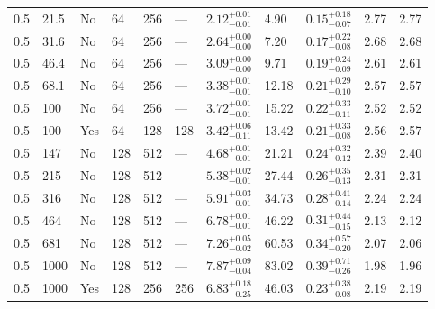 \documentclass[aps, prfluids, onecolumn, notitlepage, nofootinbib, groupedaddress, amsfonts, amssymb, amsmath]{revtex4-1}
\begin{document}
\begin{center}
\begin{longtable}{ p{1cm} p{1cm} p{1cm} p{1cm} p{1cm} p{1cm} p{1.75cm} p{1.5cm} p{2.75cm} p{1cm} p{1.2cm}  }
\vspace{0.08cm}0.5	&	21.5	&	No	&	64	&	256	&	---	&$	2.12	_{-	0.01	}^{+	0.01	}$&	4.90	&$	0.15	_{-	0.07	}^{+	0.18	}$&	2.77	&	2.77	\\
\vspace{0.08cm}0.5	&	31.6	&	No	&	64	&	256	&	---	&$	2.64	_{-	0.00	}^{+	0.00	}$&	7.20	&$	0.17	_{-	0.08	}^{+	0.22	}$&	2.68	&	2.68	\\
\vspace{0.08cm}0.5	&	46.4	&	No	&	64	&	256	&	---	&$	3.09	_{-	0.00	}^{+	0.00	}$&	9.71	&$	0.19	_{-	0.09	}^{+	0.24	}$&	2.61	&	2.61	\\
\vspace{0.08cm}0.5	&	68.1	&	No	&	64	&	256	&	---	&$	3.38	_{-	0.01	}^{+	0.01	}$&	12.18	&$	0.21	_{-	0.10	}^{+	0.29	}$&	2.57	&	2.57	\\
\vspace{0.08cm}0.5	&	100	&	No	&	64	&	256	&	---	&$	3.72	_{-	0.01	}^{+	0.01	}$&	15.22	&$	0.22	_{-	0.11	}^{+	0.33	}$&	2.52	&	2.52	\\
\vspace{0.08cm}0.5	&	100	&	Yes	&	64	&	128	&	128	&$	3.42	_{-	0.11	}^{+	0.06	}$&	13.42	&$	0.21	_{-	0.08	}^{+	0.33	}$&	2.56	&	2.57	\\
\vspace{0.08cm}0.5	&	147	&	No	&	128	&	512	&	---	&$	4.68	_{-	0.01	}^{+	0.01	}$&	21.21	&$	0.24	_{-	0.12	}^{+	0.32	}$&	2.39	&	2.40	\\
\vspace{0.08cm}0.5	&	215	&	No	&	128	&	512	&	---	&$	5.38	_{-	0.01	}^{+	0.02	}$&	27.44	&$	0.26	_{-	0.13	}^{+	0.35	}$&	2.31	&	2.31	\\
\vspace{0.08cm}0.5	&	316	&	No	&	128	&	512	&	---	&$	5.91	_{-	0.01	}^{+	0.03	}$&	34.73	&$	0.28	_{-	0.14	}^{+	0.41	}$&	2.24	&	2.24	\\
\vspace{0.08cm}0.5	&	464	&	No	&	128	&	512	&	---	&$	6.78	_{-	0.01	}^{+	0.01	}$&	46.22	&$	0.31	_{-	0.15	}^{+	0.44	}$&	2.13	&	2.12	\\
\vspace{0.08cm}0.5	&	681	&	No	&	128	&	512	&	---	&$	7.26	_{-	0.02	}^{+	0.05	}$&	60.53	&$	0.34	_{-	0.20	}^{+	0.57	}$&	2.07	&	2.06	\\
\vspace{0.08cm}0.5	&	1000	&	No	&	128	&	512	&	---	&$	7.87	_{-	0.04	}^{+	0.09	}$&	83.02	&$	0.39	_{-	0.26	}^{+	0.71	}$&	1.98	&	1.96	\\
\vspace{0.08cm}0.5	&	1000	&	Yes	&	128	&	256	&	256	&$	6.83	_{-	0.25	}^{+	0.18	}$&	46.03	&$	0.23	_{-	0.08	}^{+	0.38	}$&	2.19	&	2.19	\\

\end{longtable}
\end{center}
\end{document}
